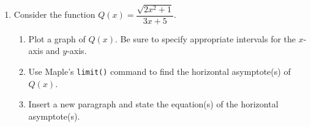\begin{enumerate}
\item Consider the function  $Q(x)=\dfrac{\sqrt{2x^2+1}}{3x+5}$.
    \begin{enumerate}
        \item Plot a graph of $Q(x)$. Be sure to specify appropriate intervals for the $x$-axis and $y$-axis.
        \item Use Maple's \texttt{limit()} command to find the horizontal asymptote(s) of $Q(x)$. 
        \item Insert a new paragraph and state the equation(s) of the horizontal asymptote(s).
\end{enumerate}     

\end{enumerate} 